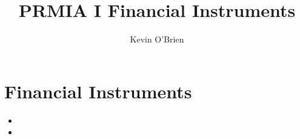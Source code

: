 \documentclass[]{article}
\title{PRMIA I Financial Instruments}
\author{Kevin O'Brien}
\begin{document}
\maketitle
\tableofcontents

\section{Financial Instruments}
\begin{itemize}
\item
\item
\end{itemize}

\newpage

\end{document}
